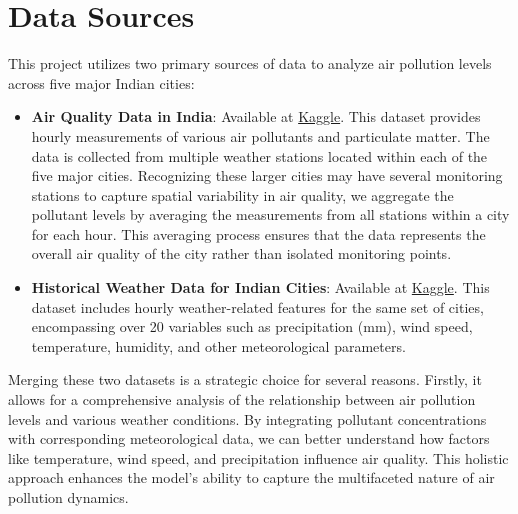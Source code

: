 \documentclass[12pt]{article}
\begin{document}


\section{Data Sources}

This project utilizes two primary sources of data to analyze air pollution levels across five major Indian cities:

\begin{itemize}
    \item \textbf{Air Quality Data in India}: Available at \href{https://www.kaggle.com/datasets/rohanrao/air-quality-data-in-india}{Kaggle}. This dataset provides hourly measurements of various air pollutants and particulate matter. The data is collected from multiple weather stations located within each of the five major cities. Recognizing these larger cities may have several monitoring stations to capture spatial variability in air quality, we aggregate the pollutant levels by averaging the measurements from all stations within a city for each hour. This averaging process ensures that the data represents the overall air quality of the city rather than isolated monitoring points.

    \item \textbf{Historical Weather Data for Indian Cities}: Available at \href{https://www.kaggle.com/datasets/hiteshsoneji/historical-weather-data-for-indian-cities?fbclid=IwY2xjawGJ4RpleHRuA2FlbQIxMAABHWvTrmK5HZhuOtOFaGmaStWQzwC0LiOHtK08q87gTHdQ36p_YVT9hVDUlg_aem_A0W4rpnHatpUfV7CUXfkkA}{Kaggle}. This dataset includes hourly weather-related features for the same set of cities, encompassing over 20 variables such as precipitation (mm), wind speed, temperature, humidity, and other meteorological parameters.
\end{itemize}

Merging these two datasets is a strategic choice for several reasons. Firstly, it allows for a comprehensive analysis of the relationship between air pollution levels and various weather conditions. By integrating pollutant concentrations with corresponding meteorological data, we can better understand how factors like temperature, wind speed, and precipitation influence air quality. This holistic approach enhances the model's ability to capture the multifaceted nature of air pollution dynamics.
\end{document}
